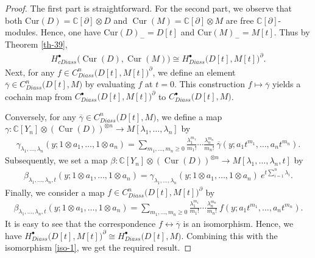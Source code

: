 \documentclass[a4paper,reqno,10pt]{amsart}
\theoremstyle{plain}
\theoremstyle{definition}
\theoremstyle{remark}
\newcommand{\C}{\mathbb{C}}
\newcommand{\p}{\partial}
\newcommand{\la}{\lambda}
\begin{document}
\begin{proof}
The first part is straightforward. For the second part, we observe that both $\mathrm{Cur}(D) = \C [\p] \otimes D$ and $\operatorname{Cur}(M) = \C [\p] \otimes M$ are free $\C[\p]$-modules. Hence, one have $\mathrm{Cur}(D)_- = D[t]$ and $\mathrm{Cur}(M)_- = M[t]$. Thus by Theorem \ref{th-39}, 
\begin{align}\label{iso-1}
    H^\bullet_{{cDiass}}
\bigl(\operatorname{Cur}(D),\operatorname{Cur}(M)\bigr)
\cong
H^\bullet_{{Diass}}\bigl(D[t],M[t]\bigr)^\p.
\end{align}
Next, for any $f \in C^n_{{Diass}}\bigl(D[t],M[t]\bigr)^\p$, we define an element $\overline{\gamma} \in C^n_{{Diass}}\bigl(D[t],M\bigr)$ by evaluating $f$ at $t=0$. This construction $f \mapsto \overline{\gamma}$ yields a cochain map from $C^\bullet_{{Diass}}\bigl(D[t],M[t]\bigr)^\p$ to $C^\bullet_{{Diass}}\bigl(D[t],M\bigr)$. 

Conversely, for any $\overline{\gamma} \in C^n_{{Diass}}\bigl(D[t],M\bigr) $, we define a map $\gamma : \C[Y_n] \otimes (\operatorname{Cur}(D))^{\otimes n} \to M [\la_1, \ldots, \la_n]$ by 
\begin{align*}
    \gamma_{\la_1, \ldots, \la_n }(y;1 \otimes {a_1}, \ldots, 1 \otimes {a_n})= \sum _{m_1, \ldots, m_n \geq 0} \frac{\la_1^{m_1}}{m_1 !} \cdots \frac{\la_n^{m_n}}{m_n !} ~ \!  \overline{\gamma}(y;{a_1}t^{m_1}, \ldots, {a_n}t^{m_n} ).
\end{align*}
Subsequently, we set a map $\beta : \C[Y_n] \otimes (\operatorname{Cur}(D))^{\otimes n} \to M [\la_1, \ldots, \la_n,t]$ by 
\begin{align*}
     \beta_{\la_1, \ldots, \la_n,t}(y;1 \otimes {a_1}, \ldots, 1 \otimes {a_n} ) = \gamma_{\la_1, \ldots, \la_n}(y; 1 \otimes {a_1}, \ldots, 1 \otimes {a_n} ) ~ \! e^{t \sum \limits _{i=1}^{n}\la_i}.
\end{align*}
Finally, we consider a map $f \in C^n_{{Diass}}\bigl(D[t],M[t]\bigr)^\p$ by 
\begin{align*}
     \beta_{\la_1, \ldots, \la_n,t }(y;1 \otimes {a_1}, \ldots, 1 \otimes {a_n})= \sum _{m_1, \ldots, m_n \geq 0} \frac{\la_1^{m_1}}{m_1 !} \cdots \frac{\la_n^{m_n}}{m_n !} ~ \!  f(y;{a_1}t^{m_1}, \ldots, {a_n}t^{m_n} ).
\end{align*}
It is easy to see that the correspondence $f \leftrightarrow \overline{\gamma}$ is an isomorphism. Hence, we have $H^\bullet_{{Diass}}
\bigl(D[t],M[t]\bigr)^\p \cong H^\bullet_{{Diass}}
\bigl(D[t],M\bigr)$. Combining this with the isomorphism \eqref{iso-1}, we get the required result. 
\end{proof}
\end{document}

